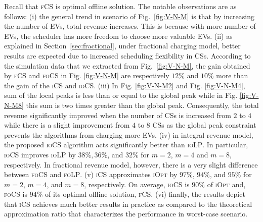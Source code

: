 \documentclass[journal]{IEEEtran}
\newcommand{\revv}[1]{{\color{black}#1}}%
\newcommand{\ics}{\textsc{iCS}\xspace}
\newcommand{\fcs}{\textsc{fCS}\xspace}
\newcommand{\focs}{\textsc{foCS}\xspace}
\newcommand{\iocs}{\textsc{ioCS}\xspace}
\newcommand{\iolp}{\textsc{ioLP}\xspace}
\newcommand{\folp}{\textsc{foLP}\xspace}
\begin{document}
Recall that \fcs is optimal offline solution. The notable observations  are  as  follows:  (i)  the  general  trend in scenario of Fig.~\ref{fig:V-N-M} is that  by increasing  the  number  of  EVs,  total  revenue  increases.  This is because with more number of EVs, the scheduler has more freedom to choose more valuable EVs. (ii)  as  explained in Section~\ref{sec:fractional}, under fractional charging model, better results are expected due to increased scheduling flexibility in CSs. According to the simulation data that we extracted from Fig.~\ref{fig:V-N-M}, the gain obtained by \fcs and \focs in Fig. \ref{fig:V-N-M} are respectively \revv{$12\%$ and $10\%$} more than the gain of the \ics and \iocs. (iii) \revv{In Fig. \ref{fig:V-N-M2} and Fig. \ref{fig:V-N-M4}, sum of the local peaks is less than or equal to the global peak while in Fig. \ref{fig:V-N-M8} this sum is two times greater than the global peak. Consequently, the total revenue significantly improved when the number of CSs is increased from $2$ to $4$ while there is a slight improvement from $4$ to $8$ CSs as the global peak constraint prevents the algorithms from charging more EVs.}
 (iv) in integral revenue model, the proposed \iocs algorithm acts significantly better than \iolp. In particular, \iocs improves \iolp by \revv{$38\%, 36\%$, and $32\%$} for $m=2$, $m=4$ and $m=8$, respectively. \revv{In fractional revenue model, however, there is a very slight difference between \focs and \folp.}
(v) \ics approximates \textsc{iOpt} by \revv{$97\%$, $94\%$, and $95\%$} for $m=2$, $m=4$, and $m=8$, respectively. On average, \iocs is \revv{$90\%$} of \textsc{iOpt} and, \focs is \revv{$94\%$} of its optimal offline solution, \fcs.  
(vi) finally, the results depict that \ics achieves much better results in practice as compared to the theoretical approximation ratio that characterizes the performance in worst-case scenario.

\end{document}
